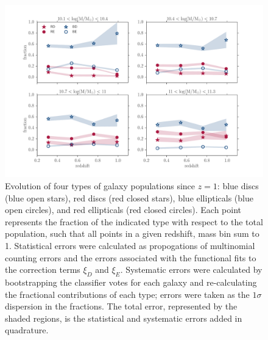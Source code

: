 \documentclass[useAMS,usenatbib]{mn2e}
\begin{document}
\begin{figure}
\centering
\includegraphics[width=\textwidth,trim={0cm 0cm 2cm 1cm},clip]{figures/morphologies_evolved.pdf}
\caption{Evolution of four types of galaxy populations since $z=1$: blue discs (blue open stars), red discs (red closed stars), blue ellipticals (blue open circles), and red ellipticals (red closed circles). Each point represents the fraction of the indicated type with respect to the total population, such that all points in a given redshift, mass bin sum to 1. Statistical errors were calculated as propogations of multinomial counting errors and the errors associated with the functional fits to the correction terms $\xi_D$ and $\xi_E$. Systematic errors were calculated by bootstrapping the classifier votes for each galaxy and re-calculating the fractional contributions of each type; errors were taken as the $1\sigma$ dispersion in the fractions. The total error, represented by the shaded regions, is the statistical and systematic errors added in quadrature.} 
\label{fig:all_plot}
\end{figure}
\end{document}
